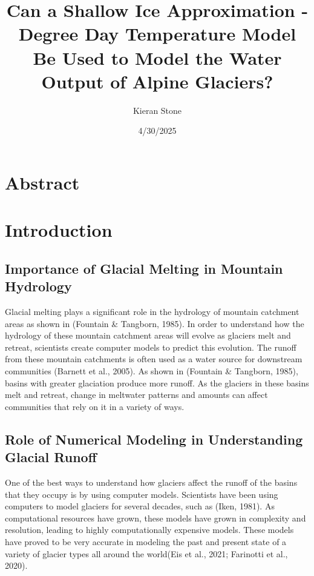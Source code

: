 \documentclass{article}
\title{Can a Shallow Ice Approximation - Degree Day Temperature Model Be Used to Model the Water Output of Alpine Glaciers?}
\author{Kieran Stone}
\date{4/30/2025}
\begin{document}
\maketitle

\section*{Abstract}

\section{Introduction}
\subsection{Importance of Glacial Melting in Mountain Hydrology}
Glacial melting plays a significant role in the hydrology of mountain catchment areas as shown in (Fountain \& Tangborn, 1985). In order to 
understand how the hydrology of these mountain catchment areas will evolve as glaciers melt and retreat, scientists create computer models to predict 
this evolution. The runoff from these mountain catchments is often used as a water source for downstream communities (Barnett et al., 2005). As shown in 
(Fountain \& Tangborn, 1985), basins with greater glaciation produce more runoff. As the glaciers in these basins melt and retreat, 
change in meltwater patterns and amounts can affect communities that rely on it in a variety of ways.

\subsection{Role of Numerical Modeling in Understanding Glacial Runoff}
One of the best ways to understand how glaciers affect the runoff of the basins that they occupy is by using computer models. 
Scientists have been using computers to model glaciers for several decades, 
such as (Iken, 1981). As computational resources have grown, these models have grown in complexity and resolution, leading 
to highly computationally expensive models. These models have proved to be very accurate in modeling the past and present state of a variety 
of glacier types all around the world(Eis et al., 2021; Farinotti et al., 2020).
\end{document}
